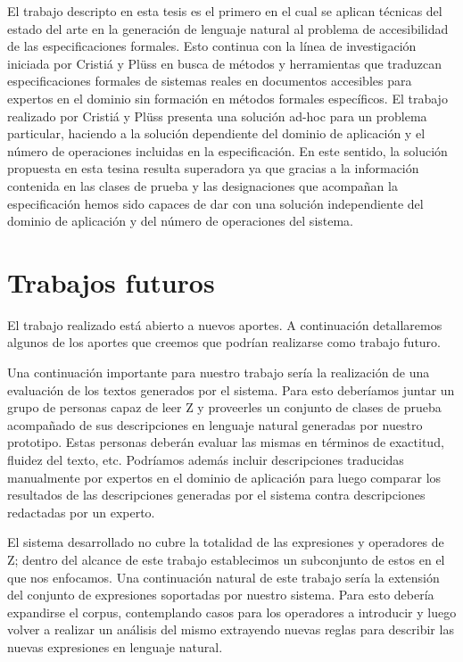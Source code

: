 El trabajo descripto en esta tesis es el primero en el cual se aplican técnicas del estado del arte en la generación de lenguaje natural al problema de accesibilidad de las especificaciones formales. Esto continua con la línea de investigación iniciada por Cristiá y Plüss \cite{cristia_pluss} en busca de métodos y herramientas que traduzcan especificaciones formales de sistemas reales en documentos accesibles para expertos en el dominio sin formación en métodos formales específicos. El trabajo realizado por Cristiá y Plüss \cite{cristia_pluss} presenta una solución ad-hoc para un problema particular, haciendo a la solución dependiente del dominio de aplicación y el número de operaciones incluidas en la especificación. En este sentido, la solución propuesta en esta tesina resulta superadora ya que gracias a la información contenida en las clases de prueba y las designaciones que acompañan la especificación hemos sido capaces de dar con una solución independiente del dominio de aplicación y del número de operaciones del sistema. 

\section*{Trabajos futuros}

El trabajo realizado está abierto a nuevos aportes. A continuación detallaremos algunos de los aportes que creemos que podrían realizarse como trabajo futuro.

Una continuación importante para nuestro trabajo sería la realización de una evaluación de los textos generados por el sistema. Para esto deberíamos juntar un grupo de personas capaz de leer Z y proveerles un conjunto de clases de prueba acompañado de sus descripciones en lenguaje natural generadas por nuestro prototipo. Estas personas deberán evaluar las mismas en términos de exactitud, fluidez del texto, etc. Podríamos además incluir descripciones traducidas manualmente por expertos en el dominio de aplicación para luego comparar los resultados de las descripciones generadas por el sistema contra descripciones redactadas por un experto.

El sistema desarrollado no cubre la totalidad de las expresiones y operadores de Z; dentro del alcance de este trabajo establecimos un subconjunto de estos en el que nos enfocamos. Una continuación natural de este trabajo sería la extensión del conjunto de expresiones soportadas por nuestro sistema. Para esto debería expandirse el corpus, contemplando casos para los operadores a introducir y luego volver a realizar un análisis del mismo extrayendo nuevas reglas para describir las nuevas expresiones en lenguaje natural. 

